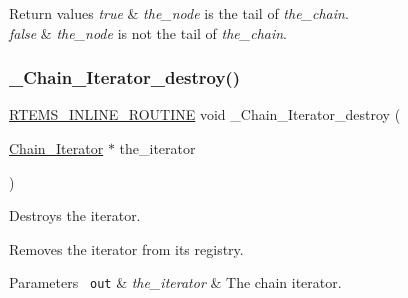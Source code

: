 \begin{DoxyRetVals}{Return values}
{\em true} & {\itshape the\+\_\+node} is the tail of {\itshape the\+\_\+chain}. \\
\hline
{\em false} & {\itshape the\+\_\+node} is not the tail of {\itshape the\+\_\+chain}. \\
\hline
\end{DoxyRetVals}
\mbox{\label{group__RTEMSScoreChain_gad8dcd1f3d1f286ce2aa20a12c661f2b7}} 
\subsubsection{\texorpdfstring{\_Chain\_Iterator\_destroy()}{\_Chain\_Iterator\_destroy()}}
{\footnotesize\ttfamily \mbox{\hyperlink{group__RTEMSScoreBaseDefs_gac216239df231d5dbd15e3520b0b9313f}{R\+T\+E\+M\+S\+\_\+\+I\+N\+L\+I\+N\+E\+\_\+\+R\+O\+U\+T\+I\+NE}} void \+\_\+\+Chain\+\_\+\+Iterator\+\_\+destroy (\begin{DoxyParamCaption}\item[{\mbox{\hyperlink{structChain__Iterator}{Chain\+\_\+\+Iterator}} $\ast$}]{the\+\_\+iterator }\end{DoxyParamCaption})}



Destroys the iterator. 

Removes the iterator from its registry.


\begin{DoxyParams}[1]{Parameters}
\mbox{\texttt{ out}}  & {\em the\+\_\+iterator} & The chain iterator. \\
\hline
\end{DoxyParams}
\mbox{\label{group__RTEMSScoreChain_gafab713cc67440572b20e0d853163d626}} 
